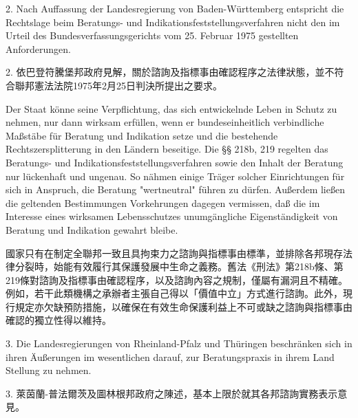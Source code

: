 \documentclass[12pt]{article}
\begin{document}
\begin{sourcepara}[title={原文理由 B.II.2--4}]
2. Nach Auffassung der Landesregierung von Baden-Württemberg entspricht die Rechtslage beim Beratungs- und Indikationsfeststellungsverfahren nicht den im Urteil des Bundesverfassungsgerichts vom 25. Februar 1975 gestellten Anforderungen.
\end{sourcepara}
\begin{transpara}
2. 依巴登符騰堡邦政府見解，關於諮詢及指標事由確認程序之法律狀態，並不符合聯邦憲法法院1975年2月25日判決所提出之要求。
\end{transpara}

\begin{sourcepara}[title={原文理由 B.II.2--4} Rn 106]
Der Staat könne seine Verpflichtung, das sich entwickelnde Leben in Schutz zu nehmen, nur dann wirksam erfüllen, wenn er bundeseinheitlich verbindliche Maßstäbe für Beratung und Indikation setze und die bestehende Rechtszersplitterung in den Ländern beseitige. Die §§ 218b, 219 \abbrStGB{} \abbrAF{} regelten das Beratungs- und Indikationsfeststellungsverfahren sowie den Inhalt der Beratung nur lückenhaft und ungenau. So nähmen einige Träger solcher Einrichtungen für sich in Anspruch, die Beratung "wertneutral" führen zu dürfen. Außerdem ließen die geltenden Bestimmungen Vorkehrungen dagegen vermissen, daß die im Interesse eines wirksamen Lebensschutzes unumgängliche Eigenständigkeit von Beratung und Indikation gewahrt bleibe.
\end{sourcepara}
\begin{transpara}
國家只有在制定全聯邦一致且具拘束力之諮詢與指標事由標準，並排除各邦現存法律分裂時，始能有效履行其保護發展中生命之義務。舊法《刑法》第218b條、第219條對諮詢及指標事由確認程序，以及諮詢內容之規制，僅屬有漏洞且不精確。例如，若干此類機構之承辦者主張自己得以「價值中立」方式進行諮詢。此外，現行規定亦欠缺預防措施，以確保在有效生命保護利益上不可或缺之諮詢與指標事由確認的獨立性得以維持。
\end{transpara}

\begin{sourcepara}[title={原文理由 B.II.2--4} Rn 107]
3. Die Landesregierungen von Rheinland-Pfalz und Thüringen beschränken sich in ihren Äußerungen im wesentlichen darauf, zur Beratungspraxis in ihrem Land Stellung zu nehmen.
\end{sourcepara}
\begin{transpara}
3. 萊茵蘭-普法爾茨及圖林根邦政府之陳述，基本上限於就其各邦諮詢實務表示意見。
\end{transpara}
\end{document}
